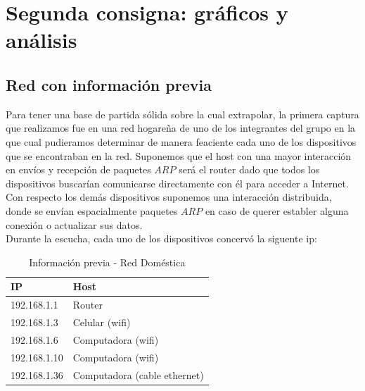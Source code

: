 \section{Segunda consigna: gráficos y análisis}

\subsection{Red con información previa}
Para tener una base de partida sólida sobre la cual extrapolar, la primera captura que realizamos fue en una red hogareña de uno de los integrantes 
del grupo en la que cual pudieramos determinar de manera feaciente cada uno de los dispositivos que se encontraban en la red. Suponemos que el host
con una mayor interacción en envíos y recepción de paquetes $ARP$ será el router dado que todos los dispositivos buscarían comunicarse directamente
con él para acceder a Internet. Con respecto los demás dispositivos suponemos una interacción distribuida, donde se envían espacialmente paquetes $ARP$
en caso de querer establer alguna conexión o actualizar sus datos.\\

Durante la escucha, cada uno de los dispositivos concervó la siguente ip:\\
\begin{table}[htb]
\begin{center}
\begin{tabular}{|l|l|}
\hline
IP & Host \\
\hline \hline
192.168.1.1 & Router \\ \hline
192.168.1.3 & Celular (wifi) \\ \hline
192.168.1.6 & Computadora (wifi)  \\ \hline
192.168.1.10 & Computadora (wifi) \\ \hline
192.168.1.36 & Computadora (cable ethernet) \\ \hline
\end{tabular}
\caption{Información previa - Red Doméstica}
\label{tabla informacion}
\end{center}
\end{table}


